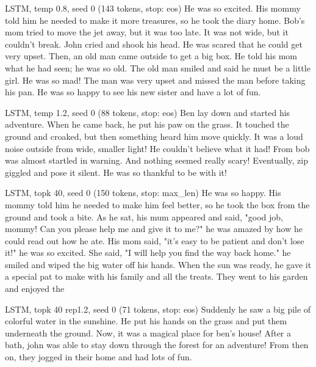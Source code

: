 \begin{modelout}{LSTM, temp 0.8, seed 0 (143 tokens, stop: eos)}
\small He was so excited. His mommy told him he needed to make it more treasures, so he took the diary home. Bob's mom tried to move the jet away, but it was too late. It was not wide, but it couldn't break. John cried and shook his head. He was scared that he could get very upset. Then, an old man came outside to get a big box. He told his mom what he had seen; he was so old. The old man smiled and said he must be a little girl. He was so mad! The man was very upset and missed the man before taking his pan. He was so happy to see his new sister and have a lot of fun.
\end{modelout}

\begin{modelout}{LSTM, temp 1.2, seed 0 (88 tokens, stop: eos)}
\small Ben lay down and started his adventure. When he came back, he put his paw on the grass. It touched the ground and croaked, but then something heard him move quickly. It was a loud noise outside from wide, smaller light! He couldn't believe what it had! From bob was almost startled in warning. And nothing seemed really scary! Eventually, zip giggled and pose it silent. He was so thankful to be with it!
\end{modelout}

\begin{modelout}{LSTM, topk 40, seed 0 (150 tokens, stop: max\_len)}
\small He was so happy. His mommy told him he needed to make him feel better, so he took the box from the ground and took a bite. As he sat, his mum appeared and said, "good job, mommy! Can you please help me and give it to me?" he was amazed by how he could read out how he ate. His mom said, "it's easy to be patient and don't lose it!" he was so excited. She said, "I will help you find the way back home." he smiled and wiped the big water off his hands. When the sun was ready, he gave it a special pat to make with his family and all the treats. They went to his garden and enjoyed the
\end{modelout}

\begin{modelout}{LSTM, topk 40 rep1.2, seed 0 (71 tokens, stop: eos)}
\small Suddenly he saw a big pile of colorful water in the sunshine. He put his hands on the grass and put them underneath the ground. Now, it was a magical place for ben's house! After a bath, john was able to stay down through the forest for an adventure! From then on, they jogged in their home and had lots of fun.
\end{modelout}






